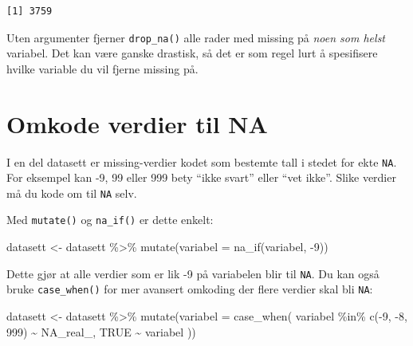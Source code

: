 \documentclass[
  norsk,
  letterpaper,
  DIV=11,
  numbers=noendperiod]{scrreprt}
\newenvironment{Shaded}{\begin{snugshade}}{\end{snugshade}}
\newcommand{\AttributeTok}[1]{\textcolor[rgb]{0.40,0.45,0.13}{#1}}
\newcommand{\ConstantTok}[1]{\textcolor[rgb]{0.56,0.35,0.01}{#1}}
\newcommand{\DecValTok}[1]{\textcolor[rgb]{0.68,0.00,0.00}{#1}}
\newcommand{\FunctionTok}[1]{\textcolor[rgb]{0.28,0.35,0.67}{#1}}
\newcommand{\NormalTok}[1]{\textcolor[rgb]{0.00,0.23,0.31}{#1}}
\newcommand{\OtherTok}[1]{\textcolor[rgb]{0.00,0.23,0.31}{#1}}
\newcommand{\SpecialCharTok}[1]{\textcolor[rgb]{0.37,0.37,0.37}{#1}}
\theoremstyle{definition}
\theoremstyle{remark}
\begin{document}
\begin{verbatim}
[1] 3759
\end{verbatim}

Uten argumenter fjerner \texttt{drop\_na()} alle rader med missing på
\emph{noen som helst} variabel. Det kan være ganske drastisk, så det er
som regel lurt å spesifisere hvilke variable du vil fjerne missing på.

\section{Omkode verdier til NA}\label{omkode-verdier-til-na}

I en del datasett er missing-verdier kodet som bestemte tall i stedet
for ekte \texttt{NA}. For eksempel kan -9, 99 eller 999 bety ``ikke
svart'' eller ``vet ikke''. Slike verdier må du kode om til \texttt{NA}
selv.

Med \texttt{mutate()} og \texttt{na\_if()} er dette enkelt:

\begin{Shaded}
\begin{Highlighting}[]
\NormalTok{datasett }\OtherTok{\textless{}{-}}\NormalTok{ datasett }\SpecialCharTok{\%\textgreater{}\%}
  \FunctionTok{mutate}\NormalTok{(}\AttributeTok{variabel =} \FunctionTok{na\_if}\NormalTok{(variabel, }\SpecialCharTok{{-}}\DecValTok{9}\NormalTok{))}
\end{Highlighting}
\end{Shaded}

Dette gjør at alle verdier som er lik -9 på variabelen blir til
\texttt{NA}. Du kan også bruke \texttt{case\_when()} for mer avansert
omkoding der flere verdier skal bli \texttt{NA}:

\begin{Shaded}
\begin{Highlighting}[]
\NormalTok{datasett }\OtherTok{\textless{}{-}}\NormalTok{ datasett }\SpecialCharTok{\%\textgreater{}\%}
  \FunctionTok{mutate}\NormalTok{(}\AttributeTok{variabel =} \FunctionTok{case\_when}\NormalTok{(}
\NormalTok{    variabel }\SpecialCharTok{\%in\%} \FunctionTok{c}\NormalTok{(}\SpecialCharTok{{-}}\DecValTok{9}\NormalTok{, }\SpecialCharTok{{-}}\DecValTok{8}\NormalTok{, }\DecValTok{999}\NormalTok{) }\SpecialCharTok{\textasciitilde{}} \ConstantTok{NA\_real\_}\NormalTok{,}
    \ConstantTok{TRUE} \SpecialCharTok{\textasciitilde{}}\NormalTok{ variabel}
\NormalTok{  ))}
\end{Highlighting}
\end{Shaded}
\end{document}
